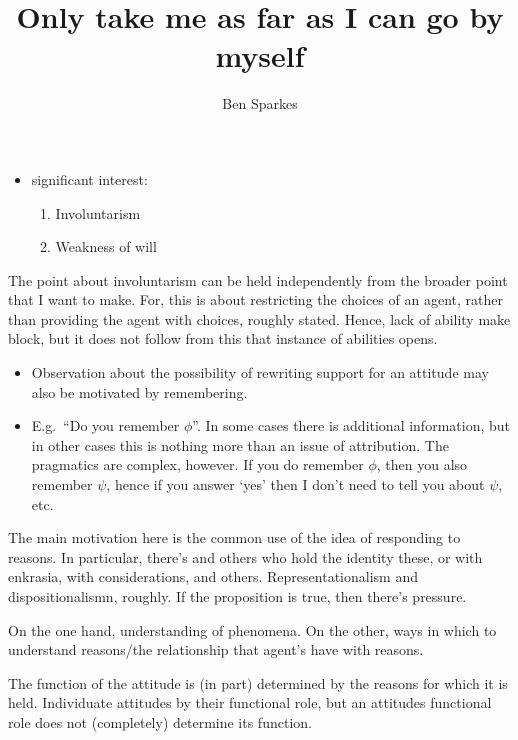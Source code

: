 \documentclass[10pt]{article}
\title{Only take me as far as I can go by myself}
\author{Ben Sparkes}
\newcommand{\hozlinedash}[0]{%
  \noindent\hdashrule[0.5ex][c]{\textwidth}{.1pt}{2.5pt}
}
\begin{document}
\tableofcontents

\hozlinedash

\begin{itemize}
\item significant interest:
  \begin{enumerate}
  \item Involuntarism
  \item Weakness of will
  \end{enumerate}
\end{itemize}

\begin{note}
  The point about involuntarism can be held independently from the broader point that I want to make.
  For, this is about restricting the choices of an agent, rather than providing the agent with choices, roughly stated.
  Hence, lack of ability make block, but it does not follow from this that instance of abilities opens.
\end{note}

\begin{itemize}
\item Observation about the possibility of rewriting support for an attitude may also be motivated by remembering.
\item E.g.\ ``Do you remember \(\phi\)''.
  In some cases there is additional information, but in other cases this is nothing more than an issue of attribution.
  The pragmatics are complex, however.
  If you do remember \(\phi\), then you also remember \(\psi\), hence if you answer `yes' then I don't need to tell you about \(\psi\), etc.
\end{itemize}

\newpage

The main motivation here is the common use of the idea of responding to reasons.
In particular, there's \citeauthor{Lord:2018aa} and others who hold the identity these, or \citeauthor{Broome:2013aa} with enkrasia, \citeauthor{Hieronymi:2018aa} with considerations, and others.
Representationalism and dispositionalismn, roughly.
If the proposition is true, then there's pressure.

On the one hand, understanding of phenomena.
On the other, ways in which to understand reasons/the relationship that agent's have with reasons.


\begin{note}
  The function of the attitude is (in part) determined by the reasons for which it is held.
  Individuate attitudes by their functional role, but an attitudes functional role does not (completely) determine its function.
\end{note}
\end{document}
